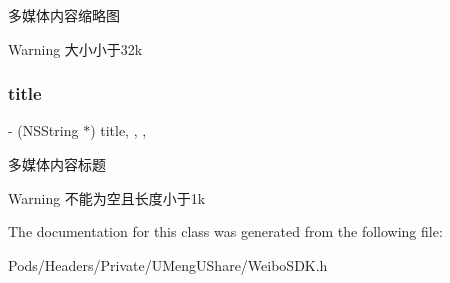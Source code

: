 多媒体内容缩略图 \begin{DoxyWarning}{Warning}
大小小于32k 
\end{DoxyWarning}
\mbox{\label{interface_w_b_base_media_object_ae9c683f03433157a29f97179435e3218}} 
\subsubsection{\texorpdfstring{title}{title}}
{\footnotesize\ttfamily -\/ (N\+S\+String $\ast$) title\hspace{0.3cm}{\ttfamily [read]}, {\ttfamily [write]}, {\ttfamily [nonatomic]}, {\ttfamily [strong]}}

多媒体内容标题 \begin{DoxyWarning}{Warning}
不能为空且长度小于1k 
\end{DoxyWarning}


The documentation for this class was generated from the following file\+:\begin{DoxyCompactItemize}
\item 
Pods/\+Headers/\+Private/\+U\+Meng\+U\+Share/Weibo\+S\+D\+K.\+h\end{DoxyCompactItemize}
